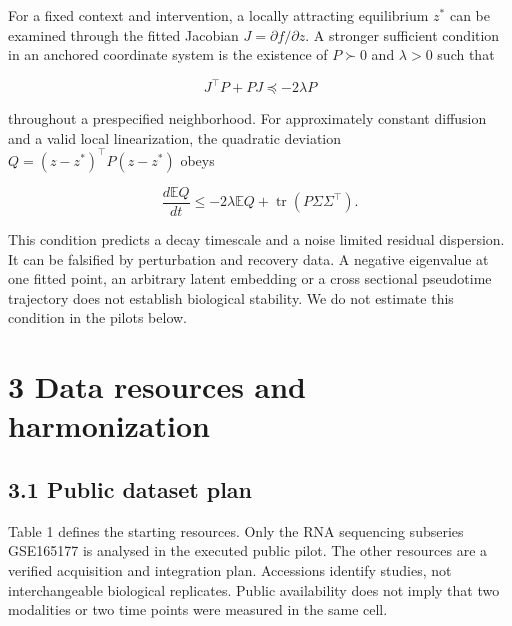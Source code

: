 \documentclass[
  11pt,
  letterpaper,
]{article}
\begin{document}
For a fixed context and intervention, a locally attracting equilibrium
\(z^*\) can be examined through the fitted Jacobian
\(J=\partial f/\partial z\). A stronger sufficient condition in an
anchored coordinate system is the existence of \(P\succ0\) and
\(\lambda>0\) such that

\[
J^\top P+PJ\preceq-2\lambda P
\]

throughout a prespecified neighborhood. For approximately constant
diffusion and a valid local linearization, the quadratic deviation
\(Q=(z-z^*)^\top P(z-z^*)\) obeys

\[
\frac{d\mathbb{E}Q}{dt}\le-2\lambda\mathbb{E}Q+
\operatorname{tr}(P\Sigma\Sigma^\top).
\]

This condition predicts a decay timescale and a noise limited residual
dispersion. It can be falsified by perturbation and recovery data. A
negative eigenvalue at one fitted point, an arbitrary latent embedding
or a cross sectional pseudotime trajectory does not establish biological
stability. We do not estimate this condition in the pilots below.

\hypertarget{data-resources-and-harmonization}{%
\section{3 Data resources and
harmonization}\label{data-resources-and-harmonization}}

\hypertarget{public-dataset-plan}{%
\subsection{3.1 Public dataset plan}\label{public-dataset-plan}}

Table 1 defines the starting resources. Only the RNA sequencing
subseries GSE165177 is analysed in the executed public pilot. The other
resources are a verified acquisition and integration plan. Accessions
identify studies, not interchangeable biological replicates. Public
availability does not imply that two modalities or two time points were
measured in the same cell.
\end{document}
